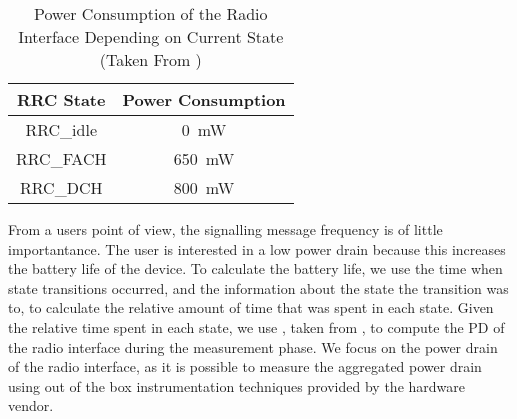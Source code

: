 \begin{table}
  \centering
  \begin{tabular}{cc}
  	\toprule
    \gls{RRC} State & Power Consumption\\
    \midrule
    \gls{RRC_idle} & \SI{0}{\milli\watt}\\
    \gls{RRC_FACH} & \SI{650}{\milli\watt}\\
    \gls{RRC_DCH} & \SI{800}{\milli\watt}\\
    \bottomrule
  \end{tabular}
  \caption{Power Consumption of the  Radio Interface Depending on Current  State (Taken From \cite{Qian2011})}
  \label{tab:network:network_traces:calculating_metrics:power_consumption}	
\end{table}

From a users point of view, the signalling message frequency is of little importantance.
The user is interested in a low power drain because this increases the battery life of the device.
To calculate the battery life, we use the time when state transitions occurred, and the information about the state the transition was to, to calculate the relative amount of time that was spent in each state.
Given the relative time spent in each state, we use , taken from \cite{Qian2011}, to compute the \gls{PD} of the radio interface during the measurement phase.
We focus on the power drain of the radio interface, as it is possible to measure the aggregated power drain using out of the box instrumentation techniques provided by the hardware vendor.